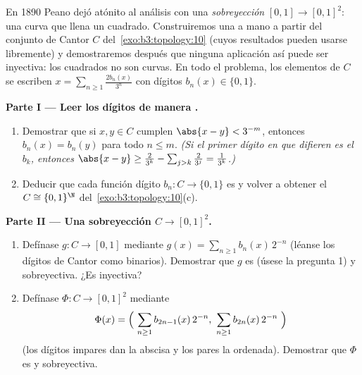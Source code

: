 \begin{problem}\label{pb:b3:topology:1} En 1890 Peano dejó
atónito al análisis con una \emph{sobreyección
} $[0,1] \to [0,1]^2$: una
curva que llena un cuadrado. Construiremos una a mano a partir del
conjunto de Cantor $C$ del~\cref{exo:b3:topology:10} (cuyos resultados
pueden usarse libremente) y demostraremos después que ninguna aplicación
así puede ser inyectiva: los cuadrados no son curvas. En todo el
problema, los elementos de $C$ se escriben $x =
\sum_{n \geq 1} \frac{2b_n(x)}{3^n}$ con dígitos $b_n(x) \in
\{0, 1\}$.

\medskip
\noindent\textbf{Parte I --- Leer los dígitos de manera
.}
\begin{enumerate}
  \item Demostrar que si $x, y \in C$ cumplen $\abs{x - y} <
        3^{-m}$, entonces $b_n(x) = b_n(y)$ para todo $n \leq m$.
  \emph{(Si el primer dígito en que difieren es el $b_k$, entonces
        $\abs{x - y} \geq \frac{2}{3^k} - \sum_{j>k}\frac2{3^j}
        = \frac1{3^k}$.)}
  \item Deducir que cada función dígito $b_n \colon C \to \{0,
        1\}$ es  y volver a
  obtener el  $C
        \cong \{0,1\}^\N$ del~\cref{exo:b3:topology:10}(c).
\end{enumerate}

\medskip
\noindent\textbf{Parte II --- Una sobreyección
 $C \to
[0,1]^2$.}
\begin{enumerate}[resume]
  \item Defínase $g \colon C \to [0,1]$ mediante $g(x) = \sum_{n\geq1}
        b_n(x)\,2^{-n}$ (léanse los dígitos de Cantor como binarios).
  Demostrar que $g$ es 
  (úsese la pregunta 1) y sobreyectiva. ¿Es inyectiva? \item Defínase
  $\Phi \colon C \to [0,1]^2$ mediante
        \[
        \Phi(x) = \Bigl(\ \sum_{n\geq1} b_{2n-1}(x)\,2^{-n},\
        \sum_{n\geq1} b_{2n}(x)\,2^{-n}\ \Bigr)
        \]
        (los dígitos impares dan la abscisa y los pares la ordenada).
        Demostrar que $\Phi$ es
         y sobreyectiva.
\end{enumerate}


\end{problem}
